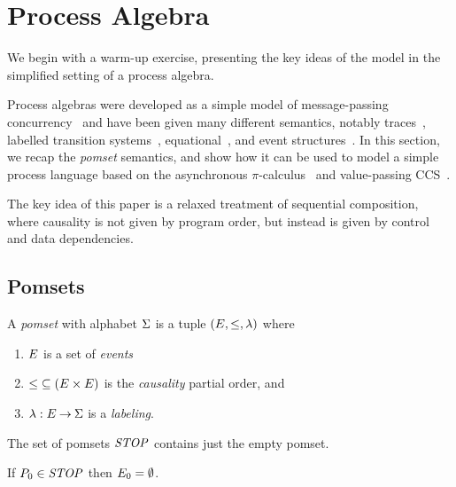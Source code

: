 \section{Process Algebra}

We begin with a warm-up exercise, presenting the key ideas of the
model in the simplified setting of a process algebra.

Process algebras were developed as a simple model of message-passing
concurrency~\cite{CCS,CSP,ACP} and have been given many different
semantics, notably traces~\cite{???}, labelled transition
systems~\cite{???}, equational~\cite{???}, and event
structures~\cite{???}.  In this section, we recap the \emph{pomset}
semantics, and show how it can be used to model a simple process
language based on the asynchronous $\pi$-calculus~\cite{???} and
value-passing CCS~\cite{???}.

The key idea of this paper is a relaxed treatment of sequential
composition, where causality is not given by program order, but
instead is given by control and data dependencies.

\subsection{Pomsets}

\begin{definition}
  A \emph{pomset} with alphabet $\Sigma$ is a tuple
  $(E, {\le}, \lambda)$ where
  \begin{enumerate}
  \item $E$ is a set of \emph{events}
  \item
    ${\le} \subseteq (E\times E)$ is the \emph{causality} partial order, and
  \item
    $\lambda: E \mathbin\rightarrow \Sigma$ is a \emph{labeling}.
  \end{enumerate}
\end{definition}

The set of pomsets $\mathit{STOP}$ contains just the empty pomset.

\begin{definition}
  If $P_0\in\mathit{STOP}$ then
  $E_0 = \emptyset$.
\end{definition}


